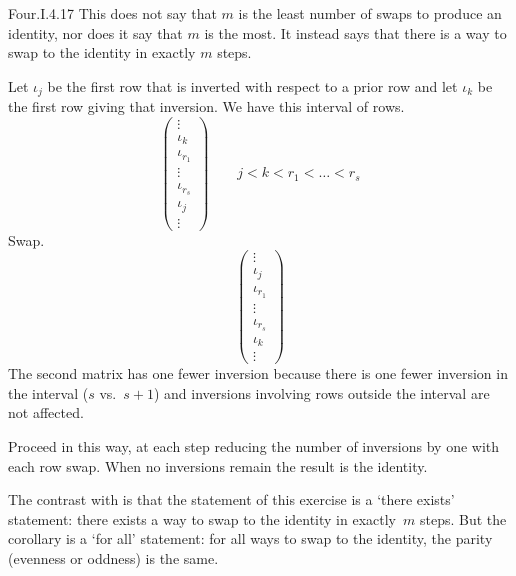 \begin{ans}{Four.I.4.17}
      This does not say that \( m \) is the least number of swaps to produce
      an identity, nor does it say that \( m \) is the most.
      It instead says that
      there is a way to swap to the identity in exactly \( m \) steps.

      Let \( \iota_j \) be the first row that is inverted with respect
      to a prior row
      and let \( \iota_k \) be the first row giving that inversion.
      We have this interval of rows.
      \begin{equation*}
         \begin{pmatrix}
           \vdots      \\
           \iota_k     \\
           \iota_{r_1} \\
           \vdots      \\
           \iota_{r_s} \\
           \iota_j     \\
           \vdots
         \end{pmatrix}
         \qquad j<k<r_1<\dots <r_s
      \end{equation*}
      Swap.
      \begin{equation*}
         \begin{pmatrix}
           \vdots      \\
           \iota_j     \\
           \iota_{r_1} \\
           \vdots      \\
           \iota_{r_s} \\
           \iota_k     \\
           \vdots
         \end{pmatrix}
      \end{equation*}
      The second matrix has one fewer inversion because there is one
      fewer inversion
      in the interval (\( s \) vs.\ \( s+1 \)) and inversions involving
      rows outside the interval are not affected.

      Proceed in this way, at each step reducing the number of inversions
      by one
      with each row swap.
      When no inversions remain the result is the identity.

      The contrast with 
      is that the statement of this exercise is a `there exists' statement:
      there exists a way to swap to the identity in exactly~$m$ steps.
      But the corollary is a `for all' statement: for all ways to swap to the
      identity, the parity (evenness or oddness) is the same.
    
\end{ans}
